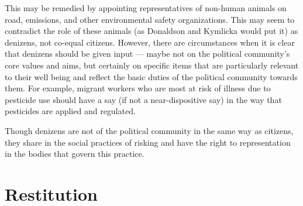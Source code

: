 \documentclass[12pt]{article}
\begin{document}
This may be remedied by appointing representatives of non-human animals on
road, emissions, and other environmental safety organizations. This may seem to
contradict the role of these animals (as Donaldson and Kymlicka would put it)
as denizens, not co-equal citizens. However, there are circumstances when it is
clear that denizens should be given input --- maybe not on the political
community’s core values and aims, but certainly on specific items that are
particularly relevant to their well being and reflect the basic duties of the
political community towards them. For example, migrant workers who are most at
risk of illness due to pesticide use should have a say (if not a
near-dispositive say) in the way that pesticides are applied and regulated.

Though denizens are not of the political community in the same way as citizens,
they share in the social practices of risking and have the right to
representation in the bodies that govern this practice.

\section{Restitution}
\end{document}
